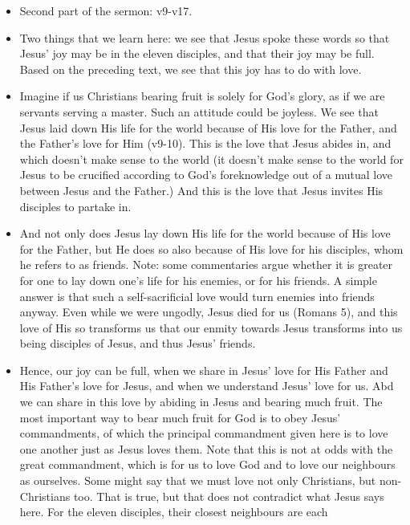 \begin{itemize}
{  faithfulness! This means that we should not have a secret faith, but we
  should speak openly and broadly about God's love for us which motivates us
  to bear the good fruit that we bear.}
  \item{Second part of the sermon: v9-v17.}
  \item{Two things that we learn here: we see that Jesus spoke these words so
  that Jesus' joy may be in the eleven disciples, and that their joy may be
  full. Based on the preceding text, we see that this joy has to do with
  love.}
  \item{Imagine if us Christians bearing fruit is solely for God's glory, as
  if we are servants serving a master. Such an attitude could be joyless. We
  see that Jesus laid down His life for the world because of His love for the
  Father, and the Father's love for Him (v9-10). This is the love that Jesus
  abides in, and which doesn't make sense to the world (it doesn't make sense
  to the world for Jesus to be crucified according to God's foreknowledge out
  of a mutual love between Jesus and the Father.) And this is the love that
  Jesus invites His disciples to partake in. }
  \item{And not only does Jesus lay down His life for the world because of
  His love for the Father, but He does so also because of His love for his
  disciples, whom he refers to as friends. Note: some commentaries argue
  whether it is greater for one to lay down one's life for his enemies, or
  for his friends. A simple answer is that such a self-sacrificial love would
  turn enemies into friends anyway. Even while we were ungodly, Jesus died
  for us (Romans 5), and this love of His so transforms us that our enmity
  towards Jesus transforms into us being disciples of Jesus, and thus Jesus'
  friends.}
  \item{Hence, our joy can be full, when we share in Jesus' love for His
  Father and His Father's love for Jesus, and when we understand Jesus' love
  for us. Abd we can share in this love by abiding in Jesus and bearing much
  fruit. The most important way to bear much fruit for God is to obey Jesus'
  commandments, of which the principal commandment given here is to love one
  another just as Jesus loves them. Note that this is not at odds with the
  great commandment, which is for us to love God and to love our neighbours
  as ourselves. Some might say that we must love not only Christians, but non-Christians too. That is true, but that does not contradict what Jesus says here. For the eleven disciples, their closest neighbours are each
}
\end{itemize}
